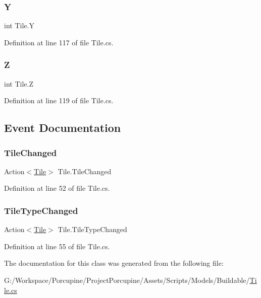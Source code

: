 \mbox{\label{class_tile_aaa6f10c5c75614c1c855a9e5be97acd0}} 
\subsubsection{\texorpdfstring{Y}{Y}}
{\footnotesize\ttfamily int Tile.\+Y\hspace{0.3cm}{\ttfamily [get]}}



Definition at line 117 of file Tile.\+cs.

\mbox{\label{class_tile_a8f051217146f35f8df3f110a5408b7fe}} 
\subsubsection{\texorpdfstring{Z}{Z}}
{\footnotesize\ttfamily int Tile.\+Z\hspace{0.3cm}{\ttfamily [get]}}



Definition at line 119 of file Tile.\+cs.



\subsection{Event Documentation}
\mbox{\label{class_tile_a95594f2dd7d805875b81820e19f25247}} 
\subsubsection{\texorpdfstring{Tile\+Changed}{TileChanged}}
{\footnotesize\ttfamily Action$<$\hyperlink{class_tile}{Tile}$>$ Tile.\+Tile\+Changed}



Definition at line 52 of file Tile.\+cs.

\mbox{\label{class_tile_a73162fe19ec1295f61ad29b0fbb1a049}} 
\subsubsection{\texorpdfstring{Tile\+Type\+Changed}{TileTypeChanged}}
{\footnotesize\ttfamily Action$<$\hyperlink{class_tile}{Tile}$>$ Tile.\+Tile\+Type\+Changed}



Definition at line 55 of file Tile.\+cs.



The documentation for this class was generated from the following file\+:\begin{DoxyCompactItemize}
\item 
G\+:/\+Workspace/\+Porcupine/\+Project\+Porcupine/\+Assets/\+Scripts/\+Models/\+Buildable/\hyperlink{_tile_8cs}{Tile.\+cs}\end{DoxyCompactItemize}
